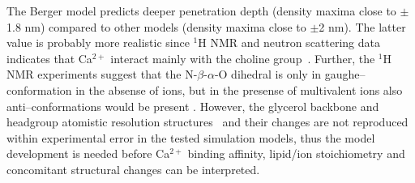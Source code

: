 \documentclass[pre,aps,floatfix,authordate1-4,twocolumn]{revtex4-1}
\begin{document}
The Berger model predicts deeper penetration depth (density maxima close to $\pm$1.8 nm) compared
to other models (density maxima close to $\pm$2 nm). The latter value is probably more realistic 
since $^1$H NMR and neutron scattering data indicates that Ca$^{2+}$ interact mainly with the 
choline group~\cite{hauser76,hauser78,herbette84,cevc90}.
Further, the $^1$H NMR experiments suggest that the N-$\beta$-$\alpha$-O dihedral is only in 
gaughe--conformation in the absense of ions, but in the presense of multivalent ions also anti--conformations
would be present \cite{hauser78, hauser81}. However, the glycerol backbone and headgroup atomistic resolution structures~\cite{botan15}
and their changes are not reproduced within experimental error in the tested simulation models,
thus the model development is needed before Ca$^{2+}$ binding affinity, lipid/ion stoichiometry 
and concomitant structural changes can be interpreted.




%
\end{document}
